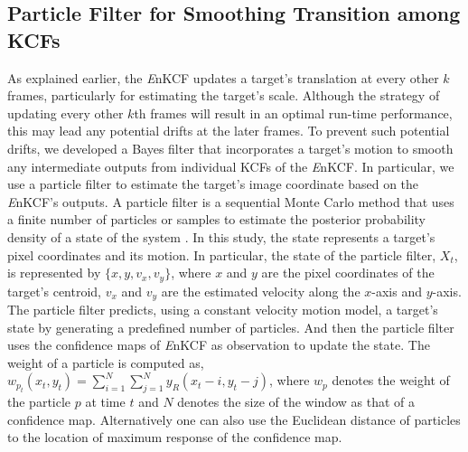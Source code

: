 \documentclass{bmvc2k}
\begin{document}
\subsection{Particle Filter for Smoothing Transition among KCFs} \label{sc:PF}
As explained earlier, the {\it E}nKCF updates a target's translation
at every other $k$ frames, particularly for estimating the target's
scale. Although the strategy of updating every other $k$th frames will
result in an optimal run-time performance, this may lead any potential
drifts at the later frames. To prevent such potential drifts, we
developed a Bayes filter that incorporates a target's motion to smooth
any intermediate outputs from individual KCFs of the {\it E}nKCF. In
particular, we use a particle filter to estimate the target's image
coordinate based on the {\it E}nKCF's outputs. A particle filter is a
sequential Monte Carlo method that uses a finite number of particles
or samples to estimate the posterior probability density of a state of
the system \cite{thrun2005probabilistic}. In this study, the state
represents a target's pixel coordinates and its motion. In particular,
the state of the particle filter, $X_t$, is represented by $\lbrace x,
y, v_{x}, v_{y} \rbrace$, where $x$ and $y$ are the pixel coordinates
of the target's centroid, $v_x$ and $v_y$ are the estimated velocity
along the $x$-axis and $y$-axis. The particle filter predicts, using a
constant velocity motion model, a target's state by generating a
predefined number of particles. And then the particle filter uses the
confidence maps of {\it E}nKCF as observation to update the state. The
weight of a particle is computed as, $w_{p_{t}}(x_{t},y_{t}) =
\sum_{i=1}^{N}\sum_{j=1}^{N} y_{R}(x_{t}-i,y_{t}-j)$, where $w_{p}$
denotes the weight of the particle $p$ at time $t$ and $N$ denotes the
size of the window as that of a confidence map. Alternatively one can
also use the Euclidean distance of particles to the location of
maximum response of the confidence map. 

\end{document}
